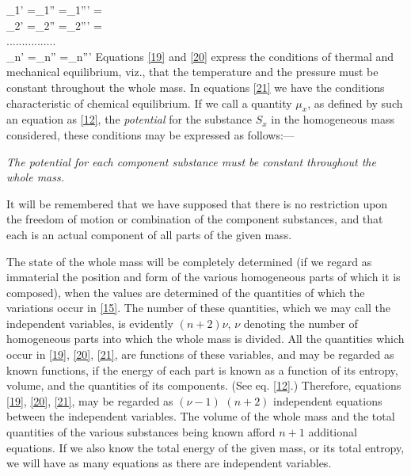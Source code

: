 \documentclass[12pt]{memoir}
\begin{document}
\eqs \mu_1' =\mu_1'' =\mu_1''' =\\
\mu_2' =\mu_2'' =\mu_2''' =  \\
................\\
\mu_n' =\mu_n'' =\mu_n''' \label{21}\eqe
Equations \ref{19} and \ref{20} express the conditions of thermal and mechanical equilibrium, viz., that the temperature and the pressure must be constant throughout the whole mass. In equations \ref{21} we have the conditions characteristic of chemical equilibrium. If we call a quantity $\mu_x$, as defined by such an equation as \ref{12}, the \textit{potential} for the substance $S_x$ in the homogeneous mass considered, these conditions may be expressed as follows:---

\textit{The potential for each component substance must be constant throughout the whole mass.}

It will be remembered that we have supposed that there is no restriction upon the freedom of motion or combination of the component substances, and that each is an actual component of all parts of the given mass.

The state of the whole mass will be completely determined (if we regard as immaterial the position and form of the various homogeneous parts of which it is composed), when the values are determined of the quantities of which the variations occur in \ref{15}. The number of these quantities, which we may call the independent variables, is evidently $(n+2)\nu$, $\nu$ denoting the number of homogeneous parts into which the whole mass is divided. All the quantities which occur in \ref{19}, \ref{20}, \ref{21}, are functions of these variables, and may be regarded as known functions, if the energy of each part is known as a function of its entropy, volume, and the quantities of its components. (See eq. \ref{12}.) Therefore, equations \ref{19}, \ref{20}, \ref{21}, may be regarded as $(\nu-1)$ $(n+2)$ independent equations between the independent variables. The volume of the whole mass and the total quantities of the various substances being known afford $ n + 1$ additional equations. If we also know the total energy of the given mass, or its total entropy, we will have as many equations as there are independent variables.
\end{document}
